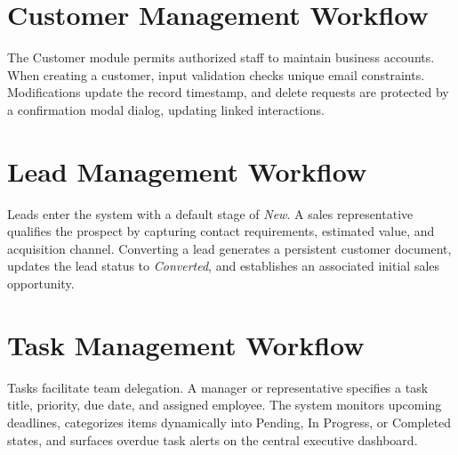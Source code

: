 \section{Customer Management Workflow}
The Customer module permits authorized staff to maintain business accounts. When creating a customer, input validation checks unique email constraints. Modifications update the record timestamp, and delete requests are protected by a confirmation modal dialog, updating linked interactions.

\section{Lead Management Workflow}
Leads enter the system with a default stage of \textit{New}. A sales representative qualifies the prospect by capturing contact requirements, estimated value, and acquisition channel. Converting a lead generates a persistent customer document, updates the lead status to \textit{Converted}, and establishes an associated initial sales opportunity.

\section{Task Management Workflow}
Tasks facilitate team delegation. A manager or representative specifies a task title, priority, due date, and assigned employee. The system monitors upcoming deadlines, categorizes items dynamically into Pending, In Progress, or Completed states, and surfaces overdue task alerts on the central executive dashboard.

